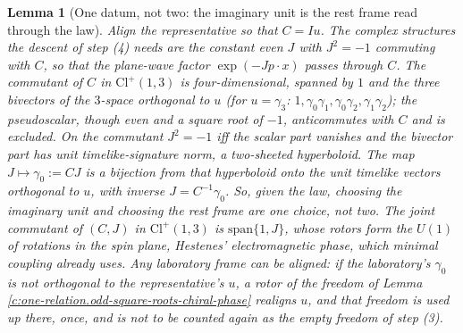 \documentclass[11pt]{article}
\newtheorem{lemma}[theorem]{Lemma}
\theoremstyle{definition}
\theoremstyle{plain}
\providecommand{\Cl}{}\renewcommand{\Cl}{\mathrm{Cl}}
\begin{document}
\begin{lemma}[One datum, not two: the imaginary unit is the rest frame read through the law]\label{c:one-relation.one-datum-not-two-imaginary-unit}
Align the representative so that $C = Iu$. The complex structures the descent of step (4) needs are the constant even $J$ with $J^{2} = -1$ commuting with $C$, so that the plane-wave factor $\exp(-Jp \cdot x)$ passes through $C$. The commutant of $C$ in $\Cl^{+}(1,3)$ is four-dimensional, spanned by $1$ and the three bivectors of the $3$-space orthogonal to $u$ (for $u = \gamma_{3}$: $1, \gamma_{0}\gamma_{1}, \gamma_{0}\gamma_{2}, \gamma_{1}\gamma_{2}$); the pseudoscalar, though even and a square root of $-1$, anticommutes with $C$ and is excluded. On the commutant $J^{2} = -1$ iff the scalar part vanishes and the bivector part has unit timelike-signature norm, a two-sheeted hyperboloid. The map $J \mapsto \gamma_{0} := CJ$ is a bijection from that hyperboloid onto the unit timelike vectors orthogonal to $u$, with inverse $J = C^{-1}\gamma_{0}$. So, given the law, choosing the imaginary unit and choosing the rest frame are one choice, not two. The joint commutant of $(C, J)$ in $\Cl^{+}(1,3)$ is $\mathrm{span}\{1, J\}$, whose rotors form the $U(1)$ of rotations in the spin plane, Hestenes' electromagnetic phase, which minimal coupling already uses. Any laboratory frame can be aligned: if the laboratory's $\gamma_{0}$ is not orthogonal to the representative's $u$, a rotor of the freedom of Lemma \ref{c:one-relation.odd-square-roots-chiral-phase} realigns $u$, and that freedom is used up there, once, and is not to be counted again as the empty freedom of step (3).
\end{lemma}
\end{document}
